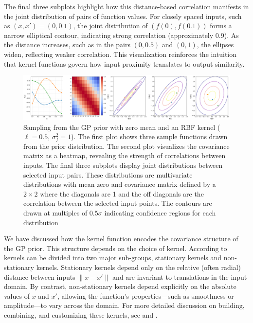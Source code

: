 \documentclass{ucdgradtaughtthesis}
\begin{document}
The final three subplots highlight how this distance-based correlation manifests in the joint distribution of pairs of function values.
For closely spaced inputs, such as \( (x, x') = (0, 0.1) \), the joint distribution of \( (f(0), f(0.1)) \) forms a narrow elliptical contour,
indicating strong correlation (approximately 0.9). As the distance increases, such as in the pairs \( (0, 0.5) \) and \( (0, 1) \), the ellipses widen, reflecting weaker correlation. This visualization reinforces the intuition that kernel functions govern how input proximity translates to output similarity.
\begin{figure}[H]
    \centering
       \includegraphics[width=\textwidth]{LatexPlots/1dplots/Kernel_background.png}
        \caption[Visualising the assumptions the kernel encodes into our GP process.]{Sampling from the GP prior with zero mean and an RBF kernel ($\ell = 0.5$, $\sigma_f^2 = 1$). 
        The first plot shows three sample functions drawn from the prior distribution. 
        The second plot visualizes the covariance matrix as a heatmap, revealing the strength of correlations between inputs.
        The final three subplots display joint distributions between selected input pairs. These distributions are multivariate distributions with mean zero and covariance matrix defined by a \(2 \times 2\) where the diagonals are 1 and the off diagonals are the correlation between the selected input points.
        The contours are drawn at multiples of \(0.5 \sigma\) indicating confidence regions for each distribution}
    \label{fig: samples_from_GP_prior}
\end{figure}
%

We have discussed how the kernel function encodes the covariance structure of the GP prior. This structure depends on the choice of kernel. According to \cite{bible}
kernels can be divided into two major sub-groups, stationary kernels and non-stationary kernels. 
Stationary kernels depend only on the relative (often radial) distance between inputs \(\|x - x'\|\) and are invariant to translations 
in the input domain. By contrast, non-stationary kernels depend explicitly on 
the absolute values of \(x\) and \(x'\), allowing the function’s properties—such as smoothness 
or amplitude—to vary across the domain. For more detailed discussion on building, combining, and customizing these kernels, 
see \cite{kernelcookbook} and \cite[Ch.~4]{bible}.
%
\end{document}
